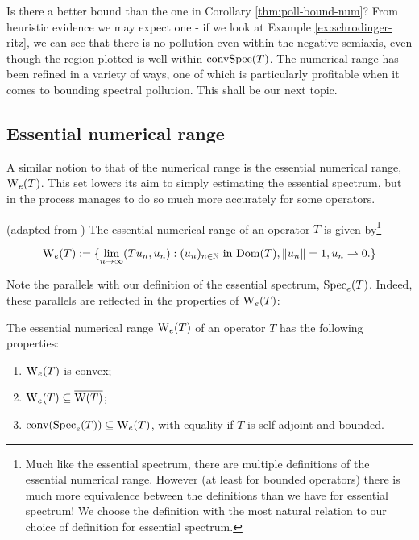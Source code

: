 \documentclass[../main.tex]{subfiles}
\begin{document}
Is there a better bound than the one in Corollary \ref{thm:poll-bound-num}? 
From heuristic evidence we may expect one - if we look
at Example \ref{ex:schrodinger-ritz}, we can see that there is no pollution even
within the negative semiaxis, even though the region plotted is well within
$\mathrm{conv}\mathrm{Spec}(T)$. The numerical range has been refined in a variety
of ways, one of which is particularly profitable when it comes to bounding
spectral pollution. This shall be our next topic.

\subsection{Essential numerical range}
A similar notion to that of the numerical range is the essential numerical
range, $\mathrm{W}_e (T)$. This set lowers its aim to simply estimating the essential
spectrum, but in the process manages to do so much more accurately for some
operators.

\begin{definition}
  (adapted from \cite{fillmore1972essential})
  The essential numerical range of an operator $T$ is given by\footnote{Much like
  the essential spectrum, there are multiple definitions of the essential
  numerical range. However (at least for bounded operators) there is much
  more equivalence between the definitions than we have for essential
  spectrum! \cite{fillmore1972essential} We choose the definition with the
  most natural relation to our choice of definition for essential spectrum.}

$$\mathrm{W}_e (T) := \{\lim_{n \rightarrow \infty}( Tu_n, u_n ) 
		  : (u_n)_{n \in \mathbb{N}}\text{ in } \mathrm{Dom}(T), \|u_n\|=1,
		    u_n \rightharpoonup 0.\}$$
\end{definition}
Note the parallels with our definition of the essential spectrum, $\mathrm{Spec}_e(T)$.
Indeed, these parallels are reflected in the properties of $\mathrm{W}_e(T)$:

\begin{proposition}
\label{thm:nume-props}
  The essential numerical range $\mathrm{W}_e(T)$ of an operator $T$ has the following properties:
  \begin{enumerate}
    \item
    \label{item:nume-convex} 
      $\mathrm{W}_e(T)$ is convex;
    \item
    \label{item:nume-in-clos-num} 
      $\mathrm{W}_e(T) \subseteq \overline{\mathrm{W}(T)}$;
    \item
    \label{item:nume-is-hull} 
      $\mathrm{conv}(\mathrm{Spec}_e(T)) \subseteq \mathrm{W}_e(T)$, with equality if $T$ is self-adjoint and bounded.
\end{enumerate}
\end{proposition}
\end{document}
